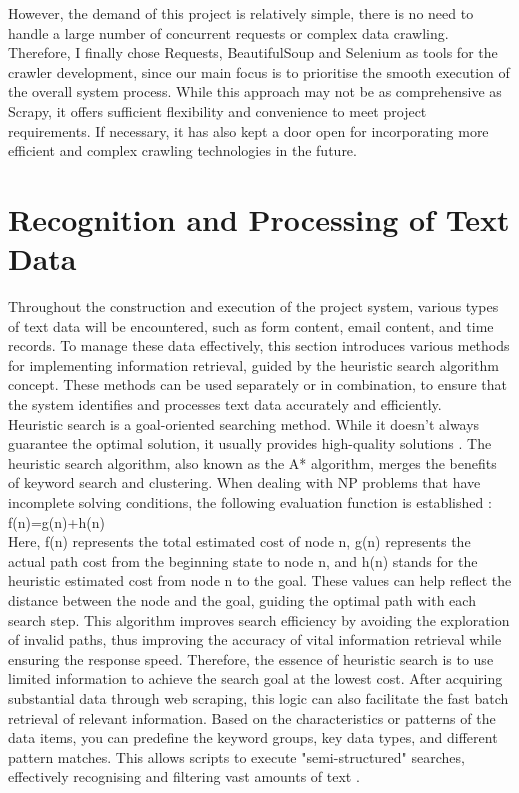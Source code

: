 \documentclass[ oneside,%
                    author={Cassie Qing Tang},
                    degree={BSc},
                     title={The Report for 3D Modelling of Queens Library \\ },
                    subtitle={ }]{dissertation}
\begin{document}
However, the demand of this project is relatively simple, there is no need to handle a large number of concurrent requests or complex data crawling. Therefore, I finally chose Requests, BeautifulSoup and Selenium as tools for the crawler development, since our main focus is to prioritise the smooth execution of the overall system process. While this approach may not be as comprehensive as Scrapy, it offers sufficient flexibility and convenience to meet project requirements. If necessary, it has also kept a door open for incorporating more efficient and complex crawling technologies in the future.


\section{Recognition and Processing of Text Data}
Throughout the construction and execution of the project system, various types of text data will be encountered, such as form content, email content, and time records. To manage these data effectively, this section introduces various methods for implementing information retrieval, guided by the heuristic search algorithm concept. These methods can be used separately or in combination, to ensure that the system identifies and processes text data accurately and efficiently.
\\

Heuristic search is a goal-oriented searching method. While it doesn't always guarantee the optimal solution, it usually provides high-quality solutions \cite{a_chapter_2001}. The heuristic search algorithm, also known as the A* algorithm, merges the benefits of keyword search and clustering. When dealing with NP problems that have incomplete solving conditions, the following evaluation function is established \cite{zhao_information_2014}:
\\

f(n)=g(n)+h(n)
\\

Here, f(n) represents the total estimated cost of node n, g(n) represents the actual path cost from the beginning state to node n, and h(n) stands for the heuristic estimated cost from node n to the goal. These values can help reflect the distance between the node and the goal, guiding the optimal path with each search step. This algorithm improves search efficiency by avoiding the exploration of invalid paths, thus improving the accuracy of vital information retrieval while ensuring the response speed. Therefore, the essence of heuristic search is to use limited information to achieve the search goal at the lowest cost. After acquiring substantial data through web scraping, this logic can also facilitate the fast batch retrieval of relevant information. Based on the characteristics or patterns of the data items, you can predefine the keyword groups, key data types, and different pattern matches. This allows scripts to execute "semi-structured" searches, effectively recognising and filtering vast amounts of text \cite{manning_introduction_2009}.
\\
\end{document}

